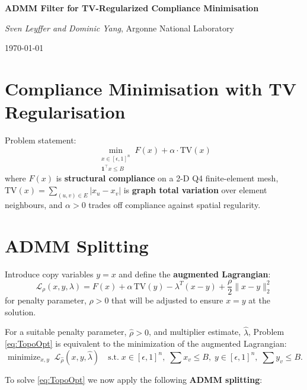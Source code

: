 \documentclass[11pt]{article}
\newcommand{\TV}{\mathrm{TV}}
\newcommand{\mini}{\mathop{\mbox{minimize}}}
\newcommand{\stn}{\text{s.t.}}
\begin{document}
\begin{center}
  {\Large\bfseries ADMM Filter for TV-Regularized Compliance Minimisation}

  \medskip
  {\em Sven Leyffer and Dominic Yang}, Argonne National Laboratory

  \smallskip
  \today
\end{center}

\section{Compliance Minimisation with TV Regularisation}

Problem statement:
\begin{equation}\label{eq:TopoOpt}
  \min_{\substack{x \in [\epsilon,1]^n \\ \mathbf{1}^\top x \leq B}}
  F(x) + \alpha \cdot \TV(x)
\end{equation}
where $F(x)$ is \textbf{structural compliance} on a 2-D Q4 finite-element mesh,
$\TV(x) = \sum_{(u,v)\in E}|x_u - x_v|$ is \textbf{graph total variation}
over element neighbours, and $\alpha > 0$ trades off compliance against
spatial regularity.

\section{ADMM Splitting}

Introduce copy variables $y = x$ and define the \textbf{augmented Lagrangian}:
\begin{equation}
  \mathcal{L}_\rho(x, y, \lambda)
  = F(x) + \alpha\,\TV(y) - \lambda^T(x - y) + \frac{\rho}{2}\|x - y\|_2^2
\end{equation}
for penalty parameter, $\rho>0$ that will be adjusted to ensure $x=y$ at the solution.

For a suitable penalty parameter, $\hat{\rho}>0$, and multiplier estimate, $\hat{\lambda}$, Problem \eqref{eq:TopoOpt} is equivalent to the minimization of the augmented Lagrangian:
\begin{equation}\label{eq:OptAugLag}
  \mini_{x,y} \; \mathcal{L}_{\hat{\rho}}(x, y, \hat{\lambda})
  \quad \stn \; x\in[\epsilon,1]^n,\; \sum x_v \leq B, \;
  y\in[\epsilon,1]^n,\; \sum y_v \leq B.
\end{equation}

\medskip
To solve \eqref{eq:TopoOpt} we now apply the following \textbf{ADMM splitting}:
\end{document}
